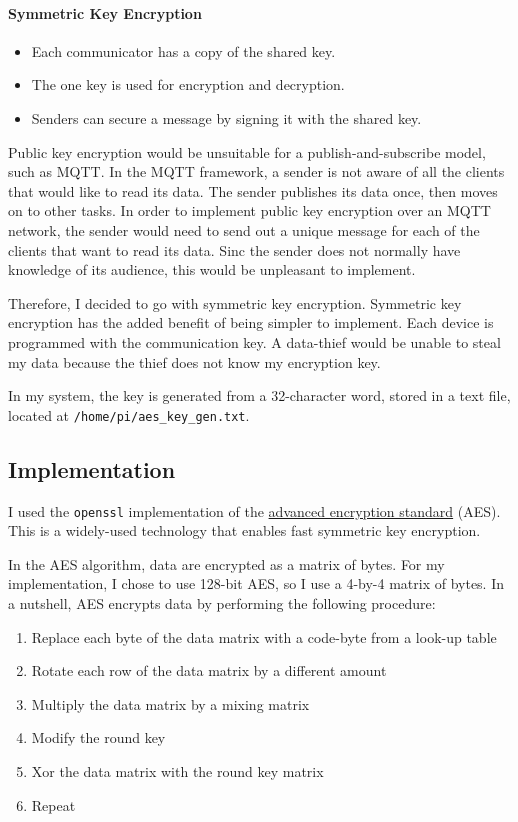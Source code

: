 \documentclass[final,titlepage,onecolumn]{article}
\begin{document}
\paragraph{Symmetric Key Encryption}
\begin{itemize}
	\item Each communicator has a copy of the shared key.
	\item The one key is used for encryption and decryption.
	\item Senders can secure a message by signing it with the shared key.
\end{itemize}

Public key encryption would be unsuitable for a publish-and-subscribe model, such as MQTT. In the MQTT framework, a sender is not aware of all the clients that would like to read its data. The sender publishes its data once, then moves on to other tasks. In order to implement public key encryption over an MQTT network, the sender would need to send out a unique message for each of the clients that want to read its data. Sinc the sender does not normally have knowledge of its audience, this would be unpleasant to implement.

Therefore, I decided to go with symmetric key encryption. Symmetric key encryption has the added benefit of being simpler to implement. Each device is programmed with the communication key. A data-thief would be unable to steal my data because the thief does not know my encryption key.

In my system, the key is generated from a 32-character word, stored in a  text file, located at \texttt{/home/pi/aes\_key\_gen.txt}. 

\subsection{Implementation}
I used the \texttt{openssl} implementation of the \href{https://www.youtube.com/watch?v=O4xNJsjtN6E}{advanced encryption standard} (AES). This is a widely-used technology that enables fast symmetric key encryption.

In the AES algorithm, data are encrypted as a matrix of bytes. For my implementation, I chose to use 128-bit AES, so I use a 4-by-4 matrix of bytes. In a nutshell, AES encrypts data by performing the following procedure:
\begin{enumerate}
	\item Replace each byte of the data matrix with a code-byte from a look-up table
	\item Rotate each row of the data matrix by a different amount
	\item Multiply the data matrix by a mixing matrix
	\item Modify the round key
	\item Xor the data matrix with the round key matrix
	\item Repeat
\end{enumerate}
\end{document}
